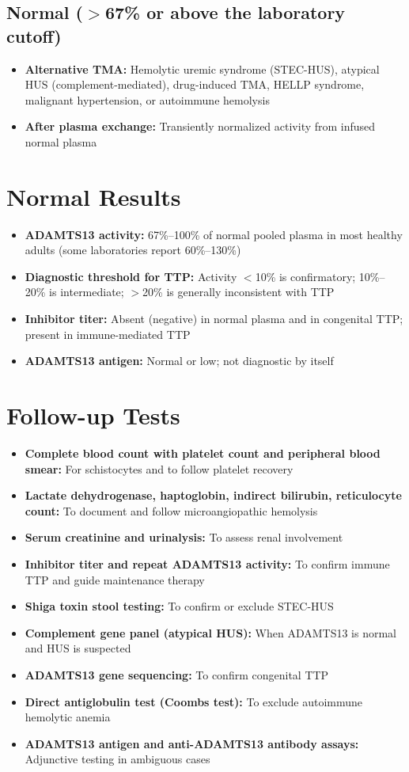 \subsection*{Normal ($>$67\% or above the laboratory cutoff)}
\begin{itemize}
  \item \textbf{Alternative TMA:} Hemolytic uremic syndrome (STEC-HUS), atypical HUS (complement-mediated), drug-induced TMA, HELLP syndrome, malignant hypertension, or autoimmune hemolysis
  \item \textbf{After plasma exchange:} Transiently normalized activity from infused normal plasma
\end{itemize}

\section*{Normal Results}
\begin{itemize}
  \item \textbf{ADAMTS13 activity:} 67\%--100\% of normal pooled plasma in most healthy adults (some laboratories report 60\%--130\%)
  \item \textbf{Diagnostic threshold for TTP:} Activity $<$10\% is confirmatory; 10\%--20\% is intermediate; $>$20\% is generally inconsistent with TTP
  \item \textbf{Inhibitor titer:} Absent (negative) in normal plasma and in congenital TTP; present in immune-mediated TTP
  \item \textbf{ADAMTS13 antigen:} Normal or low; not diagnostic by itself
\end{itemize}

\section*{Follow-up Tests}
\begin{itemize}
  \item \textbf{Complete blood count with platelet count and peripheral blood smear:} For schistocytes and to follow platelet recovery
  \item \textbf{Lactate dehydrogenase, haptoglobin, indirect bilirubin, reticulocyte count:} To document and follow microangiopathic hemolysis
  \item \textbf{Serum creatinine and urinalysis:} To assess renal involvement
  \item \textbf{Inhibitor titer and repeat ADAMTS13 activity:} To confirm immune TTP and guide maintenance therapy
  \item \textbf{Shiga toxin stool testing:} To confirm or exclude STEC-HUS
  \item \textbf{Complement gene panel (atypical HUS):} When ADAMTS13 is normal and HUS is suspected
  \item \textbf{ADAMTS13 gene sequencing:} To confirm congenital TTP
  \item \textbf{Direct antiglobulin test (Coombs test):} To exclude autoimmune hemolytic anemia
  \item \textbf{ADAMTS13 antigen and anti-ADAMTS13 antibody assays:} Adjunctive testing in ambiguous cases
\end{itemize}

